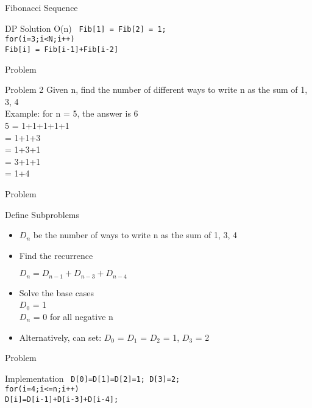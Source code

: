 \documentclass{beamer}
\begin{document}
\begin{frame}[<+->]{Fibonacci Sequence}
  \begin{block}{DP Solution O(n)}
  \tt{
    Fib[1] = Fib[2] = 1;\\
    for(i=3;i<N;i++)\\
      \hspace{2mm} Fib[i] = Fib[i-1]+Fib[i-2]}
  \end{block}
\end{frame}

\begin{frame}{Problem}
  \begin{block}{Problem 2}
    Given n, find the number of different ways to write n as the sum of 1, 3, 4\\
    Example: for n = 5, the answer is 6\\
    5 = 1+1+1+1+1\\
    = 1+1+3\\
    = 1+3+1\\
    = 3+1+1\\
    = 1+4\\
  \end{block}
\end{frame}

\begin{frame}[<+->]{Problem}
  \begin{block}{Define Subproblems}
  \begin{itemize}
    \item $D_n$ be the number of ways to write n as the sum of 1, 3, 4\\
    \item Find the recurrence\\
    \begin{center}$D_n = D_{n-1} + D_{n-3} + D_{n-4}$\end{center}
    \item Solve the base cases\\
    $D_0$ = 1\\
    $D_n$ = 0 for all negative n\\
    \item Alternatively, can set: $D_0$ = $D_1$ = $D_2$ = 1, $D_3$ = 2
  \end{itemize}
  \end{block}
\end{frame}

\begin{frame}[<+->]{Problem}
  \begin{block}{Implementation}
  \tt{
    D[0]=D[1]=D[2]=1; D[3]=2;\\
    for(i=4;i<=n;i++)\\
      \hspace{2mm} D[i]=D[i-1]+D[i-3]+D[i-4];
    }
  \end{block}
\end{frame}
\end{document}
